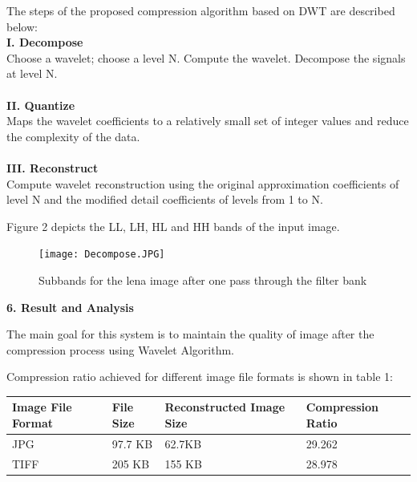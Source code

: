\documentclass{article}
\begin{document}
The steps of the proposed compression algorithm based on DWT are described below:\\
\textbf{I. Decompose}\\
Choose a wavelet; choose a level N. Compute the wavelet. Decompose the signals at level N. \\\\
\textbf{II. Quantize}\\
Maps the wavelet coefficients to a relatively small set of integer values and reduce the complexity of the data.\\\\
\textbf{III. Reconstruct}\\
Compute wavelet reconstruction using the original approximation coefficients of level N and the modified detail coefficients of levels from 1 to N.\\
\begin{flushleft}Figure 2 depicts the LL, LH, HL and HH bands of the input image.\end{flushleft}
\begin{figure}[htp]
    \centering
    \Large\texttt{[image: Decompose.JPG]}
    \caption{Subbands for the lena image after one pass through the filter bank}
    \label{fig:Decompose}
\end{figure}

\begin{flushleft}
\textbf{\large 6. Result and Analysis}
\end{flushleft}

The main goal for this system is to maintain the quality of image after the compression process using Wavelet Algorithm.

\begin{flushleft}Compression ratio achieved for different image file formats is shown in table 1: \end{flushleft}
\begin{center}
    \begin{tabular}{ | l | l | l | p{3cm} |}
    \hline
        Image File Format & File Size & Reconstructed Image Size & Compression Ratio\\
    \hline
        JPG  & 97.7 KB  & 62.7KB & 29.262  \\
    \hline
        TIFF  & 205 KB  & 155 KB & 28.978  \\
        
    \hline
    \end{tabular}
\end{center}
\end{document}
